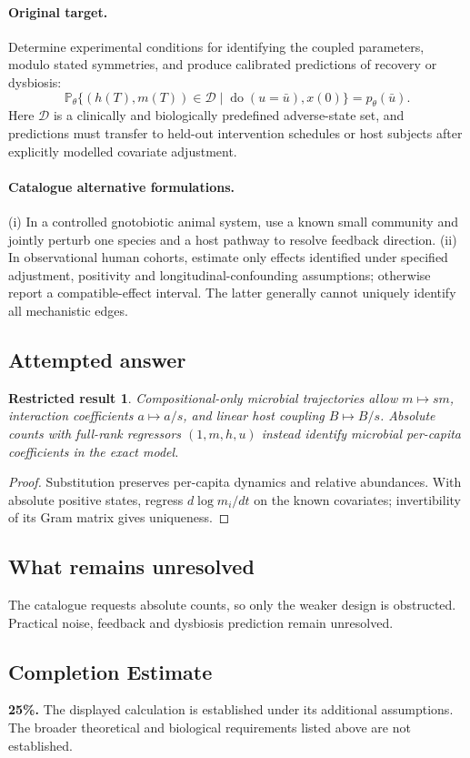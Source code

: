 \documentclass[11pt]{article}
\newcommand{\Prob}{\mathbb P}
\providecommand{\Prob}{\mathbb P}
\newtheorem{attemptresult}{Restricted result}[section]
\begin{document}
\paragraph{Original target.}
Determine experimental conditions for identifying the coupled parameters, modulo stated symmetries, and produce calibrated predictions of recovery or dysbiosis:
\[\Prob_{\theta}\{(h(T),m(T))\in\mathcal D\mid\operatorname{do}(u=\bar u),x(0)\}=p_\theta(\bar u).\]
Here $\mathcal D$ is a clinically and biologically predefined adverse-state set, and predictions must transfer to held-out intervention schedules or host subjects after explicitly modelled covariate adjustment.
\paragraph{Catalogue alternative formulations.}
(i) In a controlled gnotobiotic animal system, use a known small community and jointly perturb one species and a host pathway to resolve feedback direction. (ii) In observational human cohorts, estimate only effects identified under specified adjustment, positivity and longitudinal-confounding assumptions; otherwise report a compatible-effect interval. The latter generally cannot uniquely identify all mechanistic edges.
\subsection{Attempted answer}
\begin{attemptresult}
Compositional-only microbial trajectories allow $m\mapsto sm$, interaction coefficients $a\mapsto a/s$, and linear host coupling $B\mapsto B/s$. Absolute counts with full-rank regressors $(1,m,h,u)$ instead identify microbial per-capita coefficients in the exact model.
\end{attemptresult}
\begin{proof}
Substitution preserves per-capita dynamics and relative abundances. With absolute positive states, regress $d\log m_i/dt$ on the known covariates; invertibility of its Gram matrix gives uniqueness.
\end{proof}
\subsection{What remains unresolved}
The catalogue requests absolute counts, so only the weaker design is obstructed. Practical noise, feedback and dysbiosis prediction remain unresolved.
\subsection{Completion Estimate}
\textbf{25\%.} The displayed calculation is established under its additional assumptions. The broader theoretical and biological requirements listed above are not established.
\end{document}
